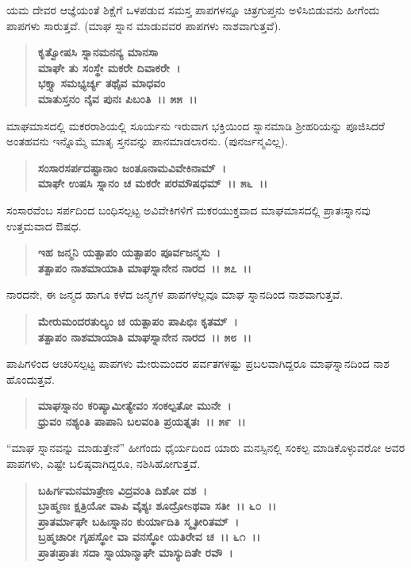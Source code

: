 ಯಮ ದೇವರ ಆಜ್ಞೆಯಂತೆ ಶಿಕ್ಷೆಗೆ ಒಳಪಡುವ ಸಮಸ್ತ ಪಾಪಗಳನ್ನೂ ಚಿತ್ರಗುಪ್ತನು ಅಳಿಸಿಬಿಡುವನು ಹೀಗೆಂದು ಪಾಪಗಳು ಸಾರುತ್ತವೆ. (ಮಾಘ ಸ್ನಾನ ಮಾಡುವವರ ಪಾಪಗಳು ನಾಶವಾಗುತ್ತವೆ).

\begin{verse}
\textbf{ಕೃತ್ವೋಷಸಿ ಸ್ನಾನಮನನ್ಯ ಮಾನಸಾ}\\\textbf{ಮಾಘೇ ತು ಸಂಸ್ಥೇ ಮಕರೇ ದಿವಾಕರೇ~।}\\\textbf{ಭಕ್ತ್ಯಾ ಸಮಭ್ಯರ್ಚ್ಯ ತಥೈವ ಮಾಧವಂ} \\\textbf{ಮಾತುಸ್ತನಂ ನೈವ ಪುನಃ ಪಿಬಂತಿ~।। ೫೫~।।}
\end{verse}

ಮಾಘಮಾಸದಲ್ಲಿ ಮಕರರಾಶಿಯಲ್ಲಿ ಸೂರ್ಯನು ಇರುವಾಗ ಭಕ್ತಿಯಿಂದ ಸ್ನಾನಮಾಡಿ ಶ‍್ರೀಹರಿಯನ್ನು ಪೂಜಿಸಿದರೆ ಅಂತಹವನು ಇನ್ನೊಮ್ಮೆ ಮಾತೃ ಸ್ತನವನ್ನು ಪಾನಮಾಡಲಾರನು. (ಪುನರ್ಜನ್ಮವಿಲ್ಲ).

\begin{verse}
\textbf{ಸಂಸಾರಸರ್ಪದಷ್ಟಾನಾಂ ಜಂತೂನಾಮವಿವೇಕಿನಾಮ್~।}\\\textbf{ಮಾಘೇ ಉಷಸಿ ಸ್ನಾನಂ ಚ ಮಕರೇ ಪರಮೌಷಧಮ್~।। ೫೬~।।}
\end{verse}

ಸಂಸಾರವೆಂಬ ಸರ್ಪದಿಂದ ಬಂಧಿಸಲ್ಪಟ್ಟ ಅವಿವೇಕಿಗಳಿಗೆ ಮಕರಯುಕ್ತವಾದ ಮಾಘಮಾಸದಲ್ಲಿ ಪ್ರಾತಃಸ್ನಾನವು ಉತ್ತಮವಾದ ಔಷಧ.

\begin{verse}
\textbf{ಇಹ ಜನ್ಮನಿ ಯತ್ಪಾಪಂ ಯತ್ಪಾಪಂ ಪೂರ್ವಜನ್ಮಸು~।}\\\textbf{ತತ್ಪಾಪಂ ನಾಶಮಾಯಾತಿ ಮಾಘಸ್ನಾನೇನ ನಾರದ~।। ೫೭~।।}
\end{verse}

ನಾರದನೇ, ಈ ಜನ್ಮದ ಹಾಗೂ ಕಳೆದ ಜನ್ಮಗಳ ಪಾಪಗಳೆಲ್ಲವೂ ಮಾಘ ಸ್ನಾನದಿಂದ ನಾಶವಾಗುತ್ತವೆ.

\begin{verse}
\textbf{ಮೇರುಮಂದರತುಲ್ಯಂ ಚ ಯತ್ಪಾಪಂ ಪಾಪಿಭಿಃ ಕೃತಮ್~।}\\\textbf{ತತ್ಪಾಪಂ ನಾಶಮಾಯಾತಿ ಮಾಘಸ್ನಾನೇನ ನಾರದ~।। ೫೮~।।}
\end{verse}

ಪಾಪಿಗಳಿಂದ ಆಚರಿಸಲ್ಪಟ್ಟ ಪಾಪಗಳು ಮೇರು\enginline{-}ಮಂದರ ಪರ್ವತಗಳಷ್ಟು ಪ್ರಬಲವಾಗಿದ್ದರೂ ಮಾಘಸ್ನಾನದಿಂದ ನಾಶ ಹೊಂದುತ್ತವೆ.

\begin{verse}
\textbf{ಮಾಘಸ್ನಾನಂ ಕರಿಷ್ಯಾಮೀತ್ಯೇವಂ ಸಂಕಲ್ಪತೋ ಮುನೇ~।}\\\textbf{ಧ್ರುವಂ ನಶ್ಯಂತಿ ಪಾಪಾನಿ ಬಲವಂತಿ ಪ್ರಯತ್ನತಃ~।। ೫೯~।।}
\end{verse}

“ಮಾಘ ಸ್ನಾನವನ್ನು ಮಾಡುತ್ತೇನೆ” ಹೀಗೆಂದು ಧೈರ್ಯದಿಂದ ಯಾರು ಮನಸ್ಸಿನಲ್ಲಿ ಸಂಕಲ್ಪ ಮಾಡಿಕೊಳ್ಳುವರೋ ಅವರ ಪಾಪಗಳು, ಎಷ್ಟೇ ಬಲಿಷ್ಠವಾಗಿದ್ದರೂ, ನಶಿಸಿಹೋಗುತ್ತವೆ.

\begin{verse}
\textbf{ಬಹಿರ್ಗಮನಮಾತ್ರೇಣ ವಿದ್ರವಂತಿ ದಿಶೋ ದಶ~।}\\\textbf{ಬ್ರಾಹ್ಮಣಃ ಕ್ಷತ್ರಿಯೋ ವಾಪಿ ವೈಶ್ಯಃ ಶೂದ್ರೋsಥವಾ ಸತೀ~।। ೬೦~।। }\\\textbf{ಪ್ರಾತರ್ಮಾಘೇ ಬಹಿಃಸ್ನಾನಂ ಕುರ್ಯಾದಿತಿ ಸ್ಮೃತೀರಿತಮ್~।}\\\textbf{ಬ್ರಹ್ಮಚಾರೀ ಗೃಹಸ್ಥೋ ವಾ ವನಸ್ಥೋ ಯತಿರೇವ ಚ~।। ೬೧~।।} \\\textbf{ಪ್ರಾತಃಪ್ರಾತಃ ಸದಾ ಸ್ನಾಯಾನ್ಮಾಘೇ ಮಾಸ್ಯುದಿತೇ ರವೌ~।}
\end{verse}

